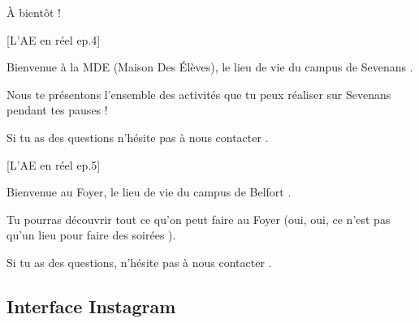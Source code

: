 \noindent À bientôt  !




[L'\gls{AE} en réel ep.4]

Bienvenue à la MDE (Maison Des Élèves), le lieu de vie du campus de Sevenans .

Nous te présentons l'ensemble des activités que tu peux réaliser sur Sevenans pendant tes pauses  !

Si tu as des questions n'hésite pas à nous contacter .

[L'\gls{AE} en réel ep.5]

Bienvenue au Foyer, le lieu de vie du campus de Belfort .

Tu pourras découvrir tout ce qu'on peut faire au Foyer  (oui, oui, ce n'est pas qu'un lieu pour faire des soirées ).

Si tu as des questions, n'hésite pas à nous contacter .


\newpage

\subsection*{Interface Instagram}\label{subsec:interface-instagram}

